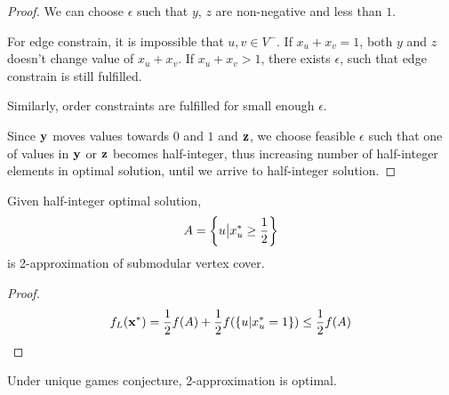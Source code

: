 \begin{prop}
\begin{proof}
		We can choose $\epsilon$ such that $y$, $z$ are non-negative and less than $1$.
		
		For edge constrain, it is impossible that $u,v \in V^-$. If $x_u+x_v=1$, both $y$ and $z$ doesn't change value of $x_u+x_v$. If $x_u+x_v>1$, there exists $\epsilon$, such that edge constrain is still fulfilled.
		
		Similarly, order constraints are fulfilled for small enough $\epsilon$.
		
		Since $\vb{y}$ moves values towards $0$ and $1$ and $\vb{z}$, we choose feasible $\epsilon$ such that one of values in $\vb{y}$ or $\vb{z}$ becomes half-integer, thus increasing number of half-integer elements in optimal solution, until we arrive to half-integer solution.
	\end{proof}
\end{prop}

\begin{prop}
	Given half-integer optimal solution, 
	\begin{align}
	A = \qty{ u \big\vert x^*_u \geq \frac{1}{2} }
	\end{align}
	is 2-approximation of submodular vertex cover.
	\begin{proof}
		\begin{align}
			f_L(\vb{x}^*) = \frac{1}{2} f(A) + \frac{1}{2} f\qty(\qty{u|x^*_u=1}) \leq  \frac{1}{2} f(A)
		\end{align}
	\end{proof}
\end{prop}

\begin{prop}
	Under unique games conjecture, 2-approximation is optimal.
\end{prop}